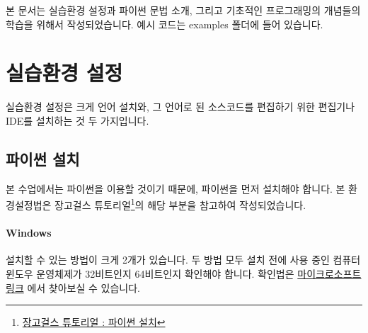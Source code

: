 \documentclass[twoside]{article}
\begin{document}
본 문서는 실습환경 설정과 파이썬 문법 소개, 그리고 기초적인 프로그래밍의 개념들의 학습을 위해서  작성되었습니다. 예시 코드는 examples 폴더에 들어 있습니다. 

\section{실습환경 설정} 

실습환경 설정은 크게 언어 설치와, 그 언어로 된 소스코드를 편집하기 위한 편집기나 IDE를 설치하는 것 두 가지입니다. 

\subsection{파이썬 설치} 

본 수업에서는 파이썬을 이용할 것이기 때문에, 파이썬을 먼저 설치해야 합니다. 본 환경설정법은 장고걸스 튜토리얼\footnote{\href{https://tutorial.djangogirls.org/ko/python\_installation/}{장고걸스 튜토리얼 : 파이썬 설치}}의 해당 부분을 참고하여 작성되었습니다. 

\paragraph{Windows} 

설치할 수 있는 방법이 크게 2개가 있습니다. 두 방법 모두 설치 전에 사용 중인 컴퓨터 윈도우 운영체제가 32비트인지 64비트인지 확인해야 합니다. 확인법은 \href{https://support.microsoft.com/ko-kr/help/13443/windows-which-operating-system}{마이크로소프트 링크} 에서 찾아보실 수 있습니다. 
\end{document}
